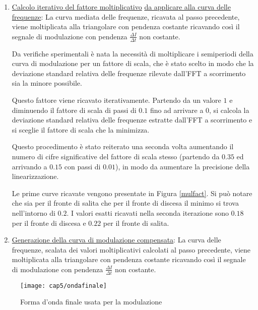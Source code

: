 \begin{enumerate}
	In questo modo si ottengono $384$ valori di frequenze per ciascun fronte, in funzione della posizione delle frange all'interno del fronte stesso (Figura \ref{curvamediatafreq}). Questo procedimento è stato effettuato per $100$ segnali acquisiti ed i risultati sono stati poi mediati. \'E stato deciso di associare ai primi $113$ ($=625-512$) campioni scartati valori di frequenza fittizi, approssimando tali valori con una retta di pendenza pari alla pendenza della prima frequenza estratta, mentre agli ultimi $128$ ($=512-384$) campioni è stata associata una retta con pendenza pari alla pendenza dell'ultima frequenza estratta.
	\item \underline{Calcolo iterativo del fattore moltiplicativo} \underline{da applicare alla curva delle} \underline{frequenze}: La curva mediata delle frequenze, ricavata al passo precedente, viene moltiplicata alla triangolare con pendenza costante ricavando così il segnale di modulazione con pendenza $\frac{\Delta I}{\Delta t}$ non costante.
	
	Da verifiche sperimentali è nata la necessità di moltiplicare i semiperiodi della curva di modulazione per un fattore di scala, che è stato scelto in modo che la deviazione standard relativa delle frequenze rilevate dall'FFT a scorrimento sia la minore possibile.
	
	Questo fattore viene ricavato iterativamente. Partendo da un valore $1$ e diminuendo il fattore di scala di passi di $0.1$ fino ad arrivare a $0$, si calcola la deviazione standard relativa delle frequenze estratte dall'FFT a scorrimento e si sceglie il fattore di scala che la minimizza.
	
	Questo procedimento è stato reiterato una seconda volta aumentando il numero di cifre significative del fattore di scala stesso (partendo da $0.35$ ed arrivando a $0.15$ con passi di $0.01$), in modo da aumentare la precisione della linearizzazione.
	
	Le prime curve ricavate vengono presentate in Figura \ref{mulfact}. Si può notare che sia per il fronte di salita che per il fronte di discesa il minimo si trova nell'intorno di $0.2$. I valori esatti ricavati nella seconda iterazione sono $0.18$ per il fronte di discesa e $0.22$ per il fronte di salita.
	\item \underline{Generazione della curva di modulazione compensata}: La curva delle frequenze, scalata dei valori moltiplicativi calcolati al passo precedente, viene moltiplicata alla triangolare con pendenza costante ricavando così il segnale di modulazione con pendenza $\frac{\Delta I}{\Delta t}$ non costante.	
\end{enumerate}
\begin{figure}  
  \begin{center}
    \texttt{[image: cap5/ondafinale]}
    \caption{Forma d'onda finale usata per la modulazione}
    \label{ondafinale}
  \end{center}
\end{figure}

